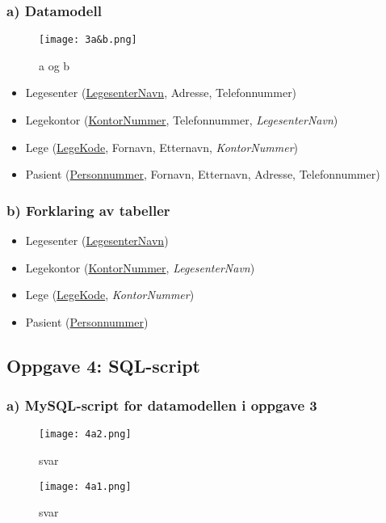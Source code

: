 \documentclass{article}
\begin{document}
\subsubsection*{a) Datamodell}
\begin{figure}[H]
    \centering
    \texttt{[image: 3a\&b.png]}
    \caption{a og b}
    \label{fig:example}
\end{figure}
\begin{itemize}
    \item Legesenter (\underline{LegesenterNavn}, Adresse, Telefonnummer)
    \item Legekontor (\underline{KontorNummer}, Telefonnummer, \textit{LegesenterNavn})
    \item Lege (\underline{LegeKode}, Fornavn, Etternavn, \textit{KontorNummer})
    \item Pasient (\underline{Personnummer}, Fornavn, Etternavn, Adresse, Telefonnummer)
\end{itemize}

\subsubsection*{b) Forklaring av tabeller}
\begin{itemize}
    \item Legesenter (\underline{LegesenterNavn})
    \item Legekontor (\underline{KontorNummer}, \textit{LegesenterNavn})
    \item Lege (\underline{LegeKode}, \textit{KontorNummer})
    \item Pasient (\underline{Personnummer})
\end{itemize}

\subsection*{Oppgave 4: SQL-script}
\subsubsection*{a) MySQL-script for datamodellen i oppgave 3}
\begin{figure}[H]
    \centering
    \texttt{[image: 4a2.png]}
    \caption{svar}
    \label{fig:example}
\end{figure}
\begin{figure}[H]
    \centering
    \texttt{[image: 4a1.png]}
    \caption{svar}
    \label{fig:example}
\end{figure}
\end{document}
